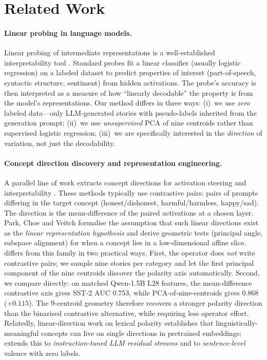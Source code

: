 \section{Related Work}
\label{sec:related}

\paragraph{Linear probing in language models.}
Linear probing of intermediate representations is a well-established
interpretability tool \cite{alain2016understanding, hewitt2019structural,
belinkov2022probing}. Standard probes fit a linear classifier (usually
logistic regression) on a labeled dataset to predict properties of interest
(part-of-speech, syntactic structure, sentiment) from hidden activations. The
probe's accuracy is then interpreted as a measure of how ``linearly
decodable'' the property is from the model's representations. Our method
differs in three ways: (i)~we use \emph{zero} labeled data---only LLM-generated
stories with pseudo-labels inherited from the generation prompt;
(ii)~we use \emph{unsupervised} PCA of nine centroids rather than supervised
logistic regression; (iii)~we are specifically interested in the
\emph{direction} of variation, not just the decodability.

\paragraph{Concept direction discovery and representation engineering.}
A parallel line of work extracts concept directions for activation steering
and interpretability
\cite{turner2024activation, rimsky2024steering, zou2023representation,
arditi2024refusal}. These methods typically use contrastive pairs: pairs
of prompts differing in the target concept (honest/dishonest,
harmful/harmless, happy/sad). The direction is the mean-difference of the
paired activations at a chosen layer. Park, Choe and Veitch
\cite{park2024linear} formalise the assumption that such linear directions
exist as the \emph{linear representation hypothesis} and derive geometric
tests (principal angle, subspace alignment) for when a concept lies in a
low-dimensional affine slice. \ours{} differs from this family in two
practical ways. First, the operator does \emph{not} write contrastive
pairs; we sample nine stories per category and let the first principal
component of the nine centroids discover the polarity axis automatically.
Second, we compare directly: on matched Qwen-1.5B L28 features, the
mean-difference contrastive axis gives SST-2 AUC $0.753$, while
PCA-of-nine-centroids gives $0.868$ ($+0.115$). The 9-centroid geometry
therefore recovers a stronger polarity direction than the binarised
contrastive alternative, while requiring less operator effort.
Relatedly, linear-direction work on lexical polarity
\cite{mikolov2013linguistic, bolukbasi2016man} establishes that
linguistically-meaningful concepts can live on single directions in
pretrained embeddings; \ours{} extends this to \emph{instruction-tuned
LLM residual streams} and to \emph{sentence-level} valence with zero
labels.

